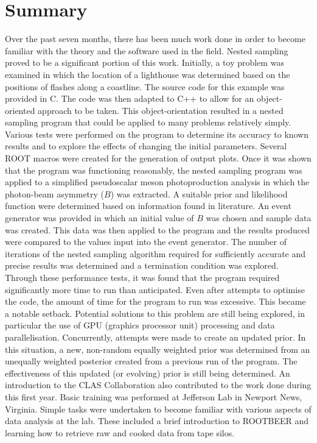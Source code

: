 \documentclass[a4paper,12pt]{article}
\begin{document}
\section{Summary}
Over the past seven months, there has been much work done in order to become familiar with the theory and the software used in the field. Nested sampling proved to be a significant portion of this work.  Initially, a toy problem was examined in which the location of a lighthouse was determined based on the positions of flashes along a coastline.  The source code for this example was provided in C.  The code was then adapted to C++ to allow for an object-oriented approach to be taken.  This object-orientation resulted in a nested sampling program that could be applied to many problems relatively simply.  Various tests were performed on the program to determine its accuracy to known results and to explore the effects of changing the initial parameters. Several ROOT macros were created for the generation of output plots.  Once it was shown that the program was functioning reasonably, the nested sampling program was applied to a simplified pseudoscalar meson photoproduction analysis in which the photon-beam asymmetry ($B$) was extracted.  A suitable prior and likelihood function were determined based on information found in literature.  An event generator was provided in which an initial value of $B$ was chosen and sample data was created.  This data was then applied to the program and the results produced were compared to the values input into the event generator.  The number of iterations of the nested sampling algorithm required for sufficiently accurate and precise results was determined and a termination condition was explored.  Through these performance tests, it was found that the program required significantly more time to run than anticipated.  Even after attempts to optimise the code, the amount of time for the program to run was excessive.  This became a notable setback.  Potential solutions to this problem are still being explored, in particular the use of GPU (graphics processor unit) processing and data parallelisation.  Concurrently, attempts were made to create an updated prior.  In this situation, a new, non-random equally weighted prior was determined from an unequally weighted posterior created from a previous run of the program.  The effectiveness of this updated (or evolving) prior is still being determined.
\newline
An introduction to the CLAS Collaboration also contributed to the work done during this first year.  Basic training was performed at Jefferson Lab in Newport News, Virginia.  Simple tasks were undertaken to become familiar with various aspects of data analysis at the lab.  These included a brief introduction to ROOTBEER and learning how to retrieve raw and cooked data from tape silos.  
\end{document}

